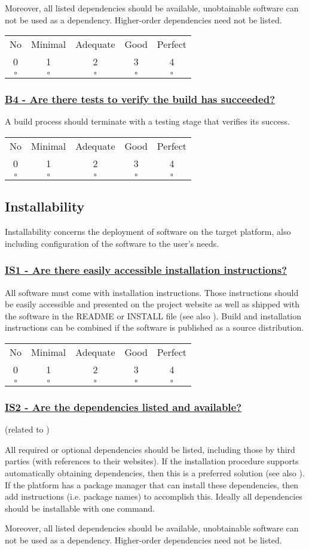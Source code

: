 \documentclass[a4paper,11pt]{article}
\newcommand{\criterion}[2]{\subsubsection*{\underline{#1 - #2}}\label{id:#1}}
\newcommand\CheckTable{%
  \begin{tabular}{ccccc}
    No & Minimal & Adequate & Good & Perfect \\
    0 & 1 & 2 & 3 & 4 \\
    \hline
    $\square$ & $\square$ & $\square$ & $\square$ & $\square$ \\
  \end{tabular}%
}
\newcommand{\refcrit}[1]{%
 \framebox[1.1\width]{\hyperref[id:#1]{#1}}
}
\begin{document}
Moreover, all listed dependencies should be available, unobtainable software
can not be used as a dependency. Higher-order dependencies need not be listed.

\CheckTable

\newcommand{\bFourID}{B4}
\newcommand{\bFourText}{Are there tests to verify the build has succeeded?}
\criterion{\bFourID}{\bFourText}

A build process should terminate with a testing stage that verifies its success.

\CheckTable

\subsection{Installability}\label{sec:ins}

Installability concerns the deployment of software on the target platform, also
including configuration of the software to the user's needs.

\newcommand{\isOneID}{IS1}
\newcommand{\isOneText}{Are there easily accessible installation instructions?}
\criterion{\isOneID}{\isOneText}

All software must come with installation instructions. Those instructions should
be easily accessible and presented on the project website as well as shipped
with the software in the README or INSTALL file (see also \refcrit{IS7}). Build and installation
instructions can be combined if the software is published as a source
distribution.

\CheckTable

\newcommand{\isTwoID}{IS2}
\newcommand{\isTwoText}{Are the dependencies listed and available?}
\criterion{\isTwoID}{\isTwoText}
(related to \refcrit{B3})

All required or optional dependencies should be listed, including those by
third parties (with references to their websites). If the installation
procedure supports automatically obtaining dependencies, then this is a
preferred solution (see also \refcrit{IS3}). If the platform has a package manager that
can install these dependencies, then add instructions (i.e. package names) to
accomplish this. Ideally all dependencies should be installable with one
command.

Moreover, all listed dependencies should be available, unobtainable software
can not be used as a dependency. Higher-order dependencies need not be listed.
%
%
\end{document}
